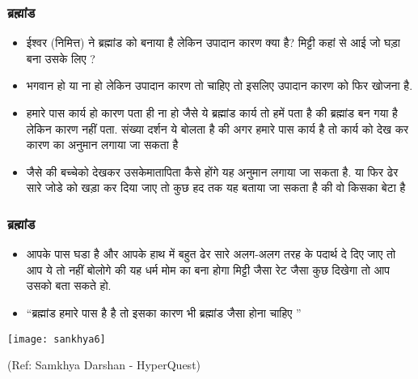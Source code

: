 \begin{frame}[fragile]\frametitle{ब्रह्मांड}

      \begin{itemize}
		\item ईश्वर (निमित्त) ने ब्रह्मांड को बनाया है लेकिन उपादान कारण क्या है? मिट्टी कहां से आई जो घड़ा बना उसके लिए ? 
		\item भगवान हो या ना हो लेकिन उपादान कारण तो चाहिए तो इसलिए उपादान कारण को फिर खोजना है. 
		\item हमारे पास कार्य हो कारण पता ही ना हो जैसे ये ब्रह्मांड कार्य तो हमें पता है की ब्रह्मांड बन गया है लेकिन कारण नहीं पता. संख्या दर्शन ये बोलता है की अगर हमारे पास कार्य है तो कार्य को देख कर कारण का अनुमान लगाया जा सकता है 
		\item जैसे की बच्चेको देखकर उसकेमातापिता कैसे होंगे यह अनुमान लगाया जा सकता है. या फिर ढेर सारे जोडे को खड़ा कर दिया जाए तो कुछ हद तक यह बताया जा सकता है की वो किसका बेटा है 
      \end{itemize}


\end{frame}

\begin{frame}[fragile]\frametitle{ब्रह्मांड}

      \begin{itemize}
		\item आपके पास घडा है और आपके हाथ में बहुत ढेर सारे अलग-अलग तरह के पदार्थ दे दिए जाए तो आप ये तो नहीं बोलोगे की यह धर्म मोम का बना होगा मिट्टी जैसा रेट जैसा कुछ दिखेगा तो आप उसको बता सकते हो.
		\item ``ब्रह्मांड हमारे पास है है तो इसका कारण भी ब्रह्मांड जैसा होना चाहिए ''
      \end{itemize}

      \begin{center}
	
        \texttt{[image: sankhya6]}
		
		{\tiny (Ref: Samkhya Darshan - HyperQuest)}
		
      \end{center}	
\end{frame}


